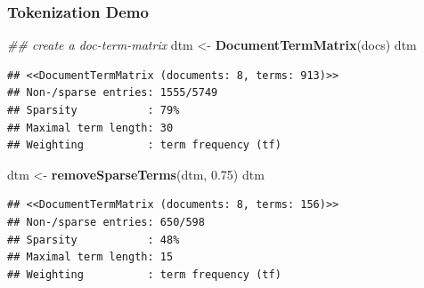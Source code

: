 \documentclass[
  shownotes,
  xcolor={svgnames},
  hyperref={colorlinks,citecolor=DarkBlue,linkcolor=DarkRed,urlcolor=DarkBlue}
  , aspectratio=169]{beamer}
\newenvironment{Shaded}{\begin{snugshade}}{\end{snugshade}}
\newcommand{\CommentTok}[1]{\textcolor[rgb]{0.56,0.35,0.01}{\textit{#1}}}
\newcommand{\FloatTok}[1]{\textcolor[rgb]{0.00,0.00,0.81}{#1}}
\newcommand{\KeywordTok}[1]{\textcolor[rgb]{0.13,0.29,0.53}{\textbf{#1}}}
\newcommand{\NormalTok}[1]{#1}
\newcommand{\StringTok}[1]{\textcolor[rgb]{0.31,0.60,0.02}{#1}}
\begin{document}
\begin{frame}[fragile]
\frametitle{Tokenization Demo}


\begin{scriptsize}

\begin{Shaded}
\begin{Highlighting}[]
\CommentTok{\#\# create a doc{-}term{-}matrix}
\NormalTok{dtm \textless{}{-}}\StringTok{ }\KeywordTok{DocumentTermMatrix}\NormalTok{(docs)}
\NormalTok{dtm }
\end{Highlighting}
\end{Shaded}


\end{scriptsize}
\begin{tiny}



\begin{verbatim}
## <<DocumentTermMatrix (documents: 8, terms: 913)>>
## Non-/sparse entries: 1555/5749
## Sparsity           : 79%
## Maximal term length: 30
## Weighting          : term frequency (tf)
\end{verbatim}

\end{tiny}
\begin{scriptsize}

\begin{Shaded}
\begin{Highlighting}[]
\NormalTok{dtm \textless{}{-}}\StringTok{ }\KeywordTok{removeSparseTerms}\NormalTok{(dtm, }\FloatTok{0.75}\NormalTok{)}
\NormalTok{dtm }
\end{Highlighting}
\end{Shaded}

\end{scriptsize}
\begin{tiny}
\begin{verbatim}
## <<DocumentTermMatrix (documents: 8, terms: 156)>>
## Non-/sparse entries: 650/598
## Sparsity           : 48%
## Maximal term length: 15
## Weighting          : term frequency (tf)
\end{verbatim}
\end{tiny}
\end{frame}
\end{document}
